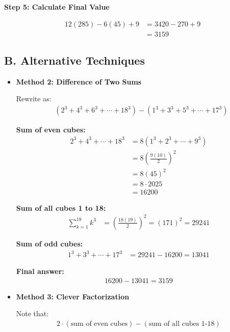 \documentclass[12pt]{article}
\begin{document}
\begin{techniquesbox}
\begin{itemize}[leftmargin=*]
    \textbf{Step 5: Calculate Final Value}
    
    \begin{align*}
    12(285) - 6(45) + 9 &= 3420 - 270 + 9\\
    &= 3159
    \end{align*}
\end{itemize}

\subsection*{B. Alternative Techniques}
\begin{itemize}[leftmargin=*]
    \item \textbf{Method 2: Difference of Two Sums}
    
    Rewrite as:
    \begin{align*}
    &(2^3 + 4^3 + 6^3 + \cdots + 18^3) - (1^3 + 3^3 + 5^3 + \cdots + 17^3)
    \end{align*}
    
    \textbf{Sum of even cubes:}
    \begin{align*}
    2^3 + 4^3 + \cdots + 18^3 &= 8(1^3 + 2^3 + \cdots + 9^3)\\
    &= 8 \left(\frac{9(10)}{2}\right)^2\\
    &= 8(45)^2\\
    &= 8 \cdot 2025\\
    &= 16200
    \end{align*}
    
    \textbf{Sum of all cubes 1 to 18:}
    \begin{align*}
    \sum_{k=1}^{18} k^3 &= \left(\frac{18(19)}{2}\right)^2 = (171)^2 = 29241
    \end{align*}
    
    \textbf{Sum of odd cubes:}
    \begin{align*}
    1^3 + 3^3 + \cdots + 17^3 &= 29241 - 16200 = 13041
    \end{align*}
    
    \textbf{Final answer:}
    \begin{align*}
    16200 - 13041 = 3159
    \end{align*}
    
    \item \textbf{Method 3: Clever Factorization}
    
    Note that:
    \begin{align*}
    2 \cdot (\text{sum of even cubes}) - (\text{sum of all cubes 1-18})
    \end{align*}
    

\end{itemize}
\end{techniquesbox}
\end{document}
